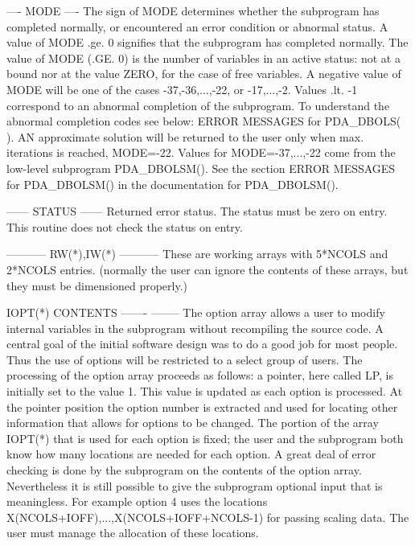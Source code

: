 \documentclass[11pt,twoside,nolof]{starlink}
\begin{document}
\begin{terminalv}
    ----
    MODE
    ----
     The sign of MODE determines whether the subprogram has completed
     normally, or encountered an error condition or abnormal status. A
     value of MODE .ge. 0 signifies that the subprogram has completed
     normally. The value of MODE (.GE. 0) is the number of variables
     in an active status: not at a bound nor at the value ZERO, for
     the case of free variables. A negative value of MODE will be one
     of the cases -37,-36,...,-22, or -17,...,-2. Values .lt. -1
     correspond to an abnormal completion of the subprogram. To
     understand the abnormal completion codes see below: ERROR
     MESSAGES for PDA_DBOLS( ). AN approximate solution will be returned
     to the user only when max. iterations is reached, MODE=-22.
     Values for MODE=-37,...,-22 come from the low-level subprogram
     PDA_DBOLSM(). See the section ERROR MESSAGES for PDA_DBOLSM() in the
     documentation for PDA_DBOLSM().

    ------
    STATUS
    ------
     Returned error status.
     The status must be zero on entry. This
     routine does not check the status on entry.

    -----------
    RW(*),IW(*)
    -----------
     These are working arrays with 5*NCOLS and 2*NCOLS entries.
     (normally the user can ignore the contents of these arrays,
     but they must be dimensioned properly.)

    IOPT(*) CONTENTS
    ------- --------
     The option array allows a user to modify internal variables in
     the subprogram without recompiling the source code. A central
     goal of the initial software design was to do a good job for most
     people. Thus the use of options will be restricted to a select
     group of users. The processing of the option array proceeds as
     follows: a pointer, here called LP, is initially set to the value
     1. This value is updated as each option is processed. At the
     pointer position the option number is extracted and used for
     locating other information that allows for options to be changed.
     The portion of the array IOPT(*) that is used for each option is
     fixed; the user and the subprogram both know how many locations
     are needed for each option. A great deal of error checking is
     done by the subprogram on the contents of the option array.
     Nevertheless it is still possible to give the subprogram optional
     input that is meaningless. For example option 4 uses the
     locations X(NCOLS+IOFF),...,X(NCOLS+IOFF+NCOLS-1) for passing
     scaling data. The user must manage the allocation of these
     locations.


\end{terminalv}
\end{document}
